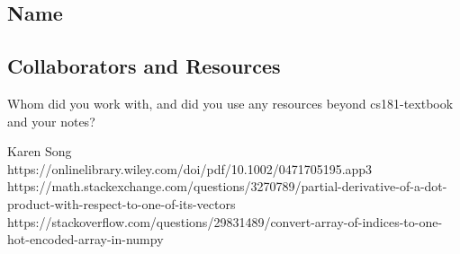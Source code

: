\documentclass[submit]{harvardml}
\begin{document}
\subsection*{Name}

\subsection*{Collaborators and Resources}
Whom did you work with, and did you use any resources beyond cs181-textbook and your notes?

Karen Song\\
https://onlinelibrary.wiley.com/doi/pdf/10.1002/0471705195.app3\\
https://math.stackexchange.com/questions/3270789/partial-derivative-of-a-dot-product-with-respect-to-one-of-its-vectors\\
https://stackoverflow.com/questions/29831489/convert-array-of-indices-to-one-hot-encoded-array-in-numpy\\
\end{document}
